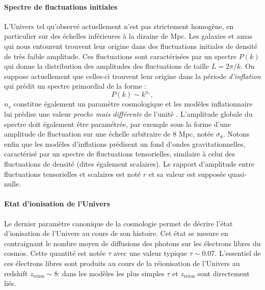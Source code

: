 \paragraph{Spectre de fluctuations initiales} L'Univers tel qu'observé actuellement n'est pas strictement homogène, en particulier sur des échelles inférieures à la dizaine de Mpc. Les galaxies et amas qui nous entourent trouvent leur origine dans des fluctuations initiales de densité de très faible amplitude. Ces fluctuations sont caractérisées par un spectre  $P(k)$ qui donne la distribution des amplitudes des fluctuations de taille $L=2\pi/k$. On suppose actuellement que celles-ci trouvent leur origine dans la période \textit{d'inflation} qui prédit un spectre primordial de la forme  :
\begin{equation}
P(k)\sim  k^{n_s},
\end{equation} 
$n_s$ constitue également un paramètre cosmologique et les modèles inflationnaire lui prédise une valeur \textit{proche mais différente} de  l'unité . L'amplitude globale du spectre doit également être paramétrée, par exemple sous la forme d'une amplitude de fluctuation sur une échelle arbitraire de 8 Mpc, notée $\sigma_8$. Notons enfin que les modèles d'inflations prédisent un fond d'ondes gravitationnelles, caractérisé par un spectre de fluctuations tensorielles, similaire à celui des fluctuations de densité (dites également scalaires). Le rapport d'amplitude entre fluctuations tensorielles et scalaires est noté $r$ et sa valeur est supposée quasi-nulle.

\paragraph{Etat d'ionisation de l'Univers} Le dernier paramètre canonique de la cosmologie permet de décrire l'état d'ionisation  de l'Univers au cours de son histoire. Cet état se mesure en  contraignant le nombre moyen de diffusions des photons sur les électrons libres du cosmos. Cette quantité est notée $\tau$ avec une valeur typique $\tau \sim 0.07$. L'essentiel de ces électrons libres sont produits au cours de la réionisation de l'Univers au redshift $z_\mathrm{reion}\sim 8$: dans les modèles les plus simples $\tau$ et $z_\mathrm{reion}$ sont directement liés.

